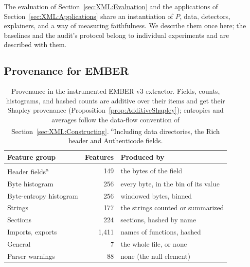 
The evaluation of Section~\ref{sec:XML:Evaluation} and the applications of Section~\ref{sec:XML:Applications} share an instantiation of $P$, data,
detectors, explainers, and a way of measuring faithfulness. We describe them once here; the baselines and the audit's
protocol belong to individual experiments and are described with them.

\subsection{Provenance for EMBER}
\label{sec:XML:SetupEMBER}

\begin{table}[t]
  \centering
  \small
  \begin{tabular}{@{}lrl@{}}
    \toprule
    Feature group & Features & Produced by \\
    \midrule
    Header fields\textsuperscript{a} & 149 & the bytes of the field \\
    Byte histogram & 256 & every byte, in the bin of its value \\
    Byte-entropy histogram & 256 & windowed bytes, binned \\
    Strings & 177 & the strings counted or summarized \\
    Sections & 224 & sections, hashed by name \\
    Imports, exports & 1{,}411 & names of functions, hashed \\
    General & 7 & the whole file, or none \\
    Parser warnings & 88 & none (the null element) \\
    \bottomrule
  \end{tabular}
  \caption{Provenance in the instrumented EMBER v3 extractor. Fields, counts, histograms, and hashed counts are additive
  over their items and get their Shapley provenance (Proposition~\ref{prop:AdditiveShapley}); entropies and averages
  follow the data-flow convention of Section~\ref{sec:XML:Constructing}. \textsuperscript{a}Including data directories,
  the Rich header and Authenticode fields.}
  \label{tab:XML:Conventions}
\end{table}

